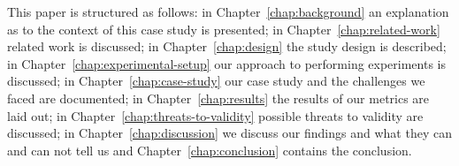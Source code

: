 This paper is structured as follows: in Chapter~\ref{chap:background} an explanation as to the context of this case study is presented; in Chapter~\ref{chap:related-work} related work is discussed; in Chapter~\ref{chap:design} the study design is described; in Chapter~\ref{chap:experimental-setup} our approach to performing experiments is discussed; in Chapter~\ref{chap:case-study} our case study and the challenges we faced are documented; in Chapter~\ref{chap:results} the results of our metrics are laid out; in Chapter~\ref{chap:threats-to-validity} possible threats to validity are discussed; in Chapter~\ref{chap:discussion} we discuss our findings and what they can and can not tell us and Chapter~\ref{chap:conclusion} contains the conclusion.